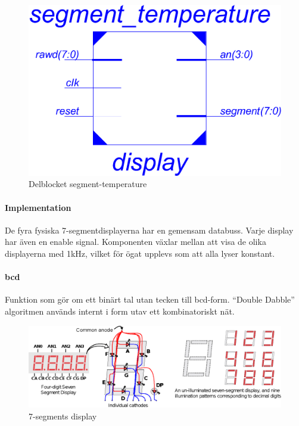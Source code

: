 \begin{figure}[htp]
\centering
\includegraphics[scale=0.5]{segment_sch.pdf}
\caption{Delblocket segment-temperature}
\end{figure}

\paragraph{Implementation}
De fyra fysiska 7-segmentdisplayerna har en gemensam databuss. Varje display har även en enable signal. Komponenten växlar mellan att visa de olika displayerna med 1kHz, vilket för ögat upplevs som att alla lyser konstant.
\paragraph{bcd}\label{sec:bcd}
Funktion som gör om ett binärt tal utan tecken till bcd-form. ``Double Dabble'' algoritmen används internt i form utav ett kombinatoriskt nät.


\begin{figure}[htp]
\centering
\includegraphics[width=\textwidth]{segment.eps}
\caption{7-segments display}
\end{figure}
